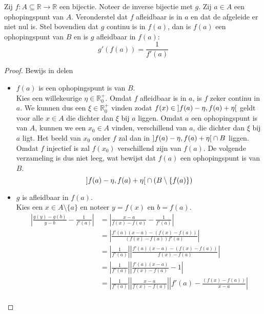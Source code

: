 \documentclass[main.tex]{subfiles}
\begin{document}
\begin{bst}
  Zij $f: A \subseteq \mathbb{R} \rightarrow \mathbb{R}$ een bijectie.
  Noteer de inverse bijectie met $g$.
  Zij $a \in A$ een ophopingspunt van $A$.
  Veronderstel dat $f$ afleidbaar is in $a$ en dat de afgeleide er niet nul is.
  Stel bovendien dat $g$ continu is in $f(a)$, dan is $f(a)$ een ophopingspunt van $B$ en is $g$ afleidbaar in $f(a)$:
  \[ g'(f(a)) = \frac{1}{f'(a)} \]

  \begin{proof}
    Bewijs in delen
    \begin{itemize}
    \item $f(a)$ is een ophopingspunt is van $B$.\\
      Kies een willekeurige $\eta \in \mathbb{R}_{0}^{+}$.
      Omdat $f$ afleidbaar is in $a$, is $f$ zeker continu in $a$.
      We kunnen dus een $\xi\in \mathbb{R}_{0}^{+}$ vinden zodat $f(x) \in \interval[open]{f(a)-\eta}{f(a)+\eta}$ geldt voor alle $x\in A$ die dichter dan $\xi$ bij $a$ liggen.
      Omdat $a$ een ophopingspunt is van $A$, kunnen we een $x_{0}\in A$ vinden, verschillend van $a$, die dichter dan $\xi$ bij $a$ ligt.
      Het beeld van $x_{0}$ onder $f$ zal dan in $\interval[open]{f(a)-\eta}{f(a)+\eta}\cap B$ liggen.
      Omdat $f$ injectief is zal $f(x_{0})$ verschillend zijn van $f(a)$.
      De volgende verzameling is dus niet leeg, wat bewijst dat $f(a)$ een ophopingspunt is van $B$.
      \[ \interval[open]{f(a)-\eta}{f(a)+\eta}\cap (B \setminus \{f(a)\}) \]
    \item $g$ is afleidbaar in $f(a)$.\\
      Kies een $x\in A\setminus \{a\}$ en noteer $y=f(x)$ en $b=f(a)$.
      \[ 
      \begin{array}{rl}
        \left| \frac{g(y)-g(b)}{y-b} - \frac{1}{f'(a)} \right|
        &= \left| \frac{x-a}{f(x)-f(a)} - \frac{1}{f'(a)} \right|\\
        &= \left| \frac{f'(a)(x-a)-(f(x)-f(a))}{(f(x)-f(a))f'(a)} \right|\\
        &= \left| \frac{1}{f'(a)}\right|\left| \frac{f'(a)(x-a)-(f(x)-f(a))}{f(x)-f(a)} \right|\\
        &= \left| \frac{1}{f'(a)}\right|\left|\frac{f'(a)(x-a)}{f(x)-f(a)} -1 \right|\\
        &= \left| \frac{1}{f'(a)} \right| \left| \frac{x-a}{f(x)-f(a)} \right| \left| f'(a)-\frac{(f(x)-f(a))}{x-a} \right|\\
      \end{array}
\]
\end{itemize}
\end{proof}
\end{bst}
\end{document}
